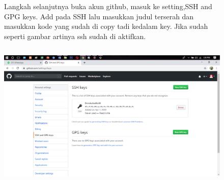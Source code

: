 \documentclass{book}
\begin{document}
\begin{enumerate}
\begin{figure}
    \item Langkah selanjutnya buka akun github, masuk ke setting,SSH and GPG keys. Add pada SSH lalu masukkan judul terserah dan masukkan kode yang sudah di copy tadi kedalam key. Jika sudah seperti gambar artinya ssh sudah di aktifkan.\\
    \centerline{\includegraphics [width=12.46cm, height=7cm]{figures/3.4.png}}\\
\end{figure}
\end{enumerate}
\end{document}
